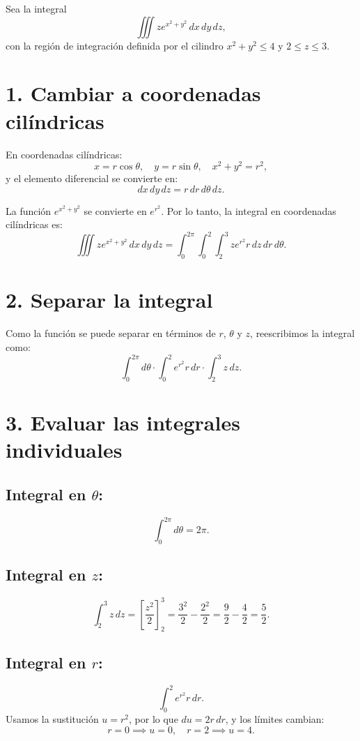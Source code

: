 \documentclass{article}
\begin{document}
Sea la integral
\[
\iiint ze^{x^2 + y^2} \, dx \, dy \, dz,
\]
con la región de integración definida por el cilindro \(x^2 + y^2 \leq 4\) y \(2 \leq z \leq 3\).

\section*{1. Cambiar a coordenadas cilíndricas}

En coordenadas cilíndricas:
\[
x = r\cos\theta, \quad y = r\sin\theta, \quad x^2 + y^2 = r^2,
\]
y el elemento diferencial se convierte en:
\[
dx \, dy \, dz = r \, dr \, d\theta \, dz.
\]

La función \(e^{x^2 + y^2}\) se convierte en \(e^{r^2}\). Por lo tanto, la integral en coordenadas cilíndricas es:
\[
\iiint ze^{x^2 + y^2} \, dx \, dy \, dz = \int_{0}^{2\pi} \int_{0}^{2} \int_{2}^{3} z e^{r^2} r \, dz \, dr \, d\theta.
\]

\section*{2. Separar la integral}

Como la función se puede separar en términos de \(r\), \(\theta\) y \(z\), reescribimos la integral como:
\[
\int_{0}^{2\pi} d\theta \cdot \int_{0}^{2} e^{r^2}r \, dr \cdot \int_{2}^{3} z \, dz.
\]

\section*{3. Evaluar las integrales individuales}

\subsection*{Integral en \(\theta\):}
\[
\int_{0}^{2\pi} d\theta = 2\pi.
\]

\subsection*{Integral en \(z\):}
\[
\int_{2}^{3} z \, dz = \left[\frac{z^2}{2}\right]_{2}^{3} = \frac{3^2}{2} - \frac{2^2}{2} = \frac{9}{2} - \frac{4}{2} = \frac{5}{2}.
\]

\subsection*{Integral en \(r\):}
\[
\int_{0}^{2} e^{r^2} r \, dr.
\]
Usamos la sustitución \(u = r^2\), por lo que \(du = 2r \, dr\), y los límites cambian:
\[
r = 0 \implies u = 0, \quad r = 2 \implies u = 4.
\]
\end{document}
